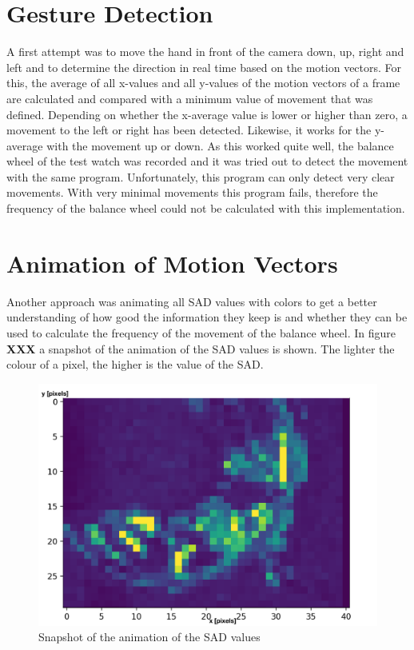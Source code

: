 \documentclass[12pt, a4paper]{report}
\begin{document}
    \section{Gesture Detection}
    A first attempt was to move the hand in front of the camera down, up, right and left and to determine the direction in real time based on the motion vectors. 
    \newline
    For this, the average of all x-values and all y-values of the motion vectors of a frame are calculated and compared with a minimum value of movement that was defined. Depending on whether the x-average value is lower or higher than zero, a movement to the left or right has been detected. Likewise, it works for the y-average with the movement up or down.
        \newline
 As this worked quite well, the balance wheel of the test watch was recorded and it was tried out to detect the movement with the same program. Unfortunately, this program can only detect very clear movements. With very minimal movements this program fails, therefore the frequency of the balance wheel could not be calculated with this implementation. 
    
    \section{Animation of Motion Vectors}
    
   Another approach was animating all SAD values with colors to get a better understanding of how good the information they keep is and whether they can be used to calculate the frequency of the movement of the balance wheel. In figure \textbf{XXX} a snapshot of the animation of the SAD values is shown. The lighter the colour of a pixel, the higher is the value of the SAD. 
    
    \noindent
    \begin{figure}[H]
    \centering
    \includegraphics[scale=0.6]{Images/animation_sad.png}
    
    \caption{Snapshot of the animation of the SAD values}
    \end{figure}
     
\end{document}

